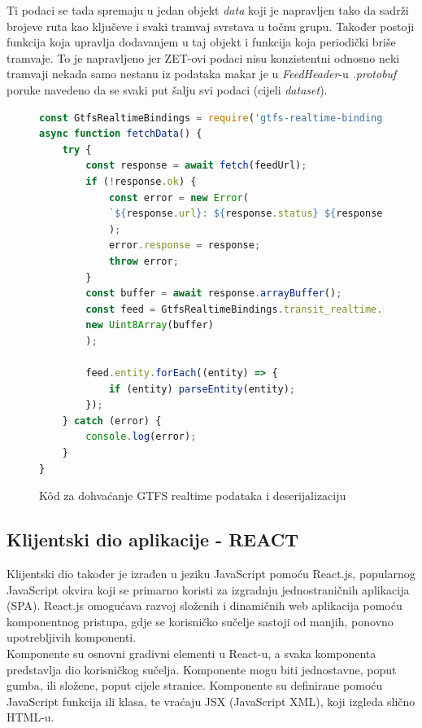 \documentclass[zavrsnirad]{fer}
\begin{document}
Ti podaci se tada spremaju u jedan objekt \textit{data} koji je napravljen tako da sadrži brojeve ruta kao ključeve i svaki tramvaj svrstava u točnu grupu. Također postoji funkcija koja upravlja dodavanjem u taj objekt i funkcija koja periodički briše tramvaje. To je napravljeno jer ZET-ovi podaci nisu konzistentni odnosno neki tramvaji nekada samo nestanu iz podataka makar je u \textit{FeedHeader}-u \textit{.protobuf} poruke navedeno da se svaki put šalju svi podaci (cijeli \textit{dataset}).

\begin{figure}[H]
	\centering
	\begin{minipage}{0.9\linewidth}
		\begin{lstlisting}[language=JavaScript]
const GtfsRealtimeBindings = require('gtfs-realtime-bindings');
async function fetchData() {
	try {
		const response = await fetch(feedUrl);
		if (!response.ok) {
			const error = new Error(
			`${response.url}: ${response.status} ${response.statusText}`
			);
			error.response = response;
			throw error;
		}
		const buffer = await response.arrayBuffer();
		const feed = GtfsRealtimeBindings.transit_realtime.FeedMessage.decode(
		new Uint8Array(buffer)
		);
		
		feed.entity.forEach((entity) => {
			if (entity) parseEntity(entity);
		});
	} catch (error) {
		console.log(error);
	}
}
		\end{lstlisting}
	\end{minipage}
	\caption{K\^od za dohvaćanje GTFS realtime podataka i deserijalizaciju}
	\label{slk:dohvatGTFS}
\end{figure}
\newpage

\subsection{Klijentski dio aplikacije - REACT}
\label{sec:frontend}

Klijentski dio također je izrađen u jeziku JavaScript pomoću React.js, popularnog JavaScript okvira koji se primarno koristi za izgradnju jednostraničnih aplikacija (SPA). React.js omogućava razvoj složenih i dinamičnih web aplikacija pomoću komponentnog pristupa, gdje se korisničko sučelje sastoji od manjih, ponovno upotrebljivih komponenti.\\
Komponente su osnovni gradivni elementi u React-u, a svaka komponenta predstavlja dio korisničkog sučelja. Komponente mogu biti jednostavne, poput gumba, ili složene, poput cijele stranice. Komponente su definirane pomoću JavaScript funkcija ili klasa, te vraćaju JSX (JavaScript XML), koji izgleda slično HTML-u.\\
\end{document}

